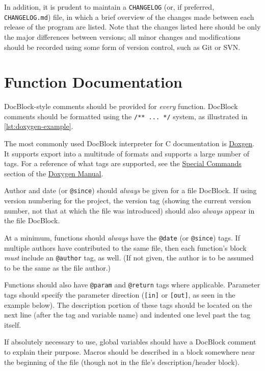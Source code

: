 \documentclass[11pt]{book}
\begin{document}
In addition, it is prudent to maintain a \texttt{CHANGELOG} (or, if
preferred, \texttt{CHANGELOG.md}) file, in which a brief overview of the
changes made between each release of the program are listed. Note that
the changes listed here should be only the major differences between
versions; all minor changes and modifications should be recorded using
some form of version control, such as Git or SVN.

\section{Function Documentation}\label{function-documentation}

DocBlock-style comments should be provided for \emph{every} function.
DocBlock comments should be formatted using the \texttt{/**\ ...\ */}
system, as illustrated in \autoref{lst:doxygen-example}.

The most commonly used DocBlock interpreter for C documentation is
\href{http://www.stack.nl/~dimitri/doxygen/}{Doxgen}. It supports export
into a multitude of formats and supports a large number of tags. For a
reference of what tags are supported, see the
\href{http://www.stack.nl/~dimitri/doxygen/manual/commands.html}{Special
Commands} section of the
\href{http://www.stack.nl/~dimitri/doxygen/manual/index.html}{Doxygen
Manual}.

Author and date (or \texttt{@since}) should \emph{always} be given for a
file DocBlock. If using version numbering for the project, the version
tag (showing the current version number, not that at which the file was
introduced) should also \emph{always} appear in the file DocBlock.

At a minimum, functions should \emph{always} have the \texttt{@date} (or
\texttt{@since}) tags. If multiple authors have contributed to the same
file, then each function's block \emph{must} include an \texttt{@author}
tag, as well. (If not given, the author is to be assumed to be the same
as the file author.)

Functions should also have \texttt{@param} and \texttt{@return} tags
where applicable. Parameter tags should specify the parameter direction
(\texttt{{[}in{]}} or \texttt{{[}out{]}}, as seen in the example below).
The description portion of these tags should be located on the next line
(after the tag and variable name) and indented one level past the tag
itself.

If absolutely necessary to use, global variables should have a DocBlock
comment to explain their purpose. Macros should be described in a block
somewhere near the beginning of the file (though not in the file's
description/header block).
\end{document}
